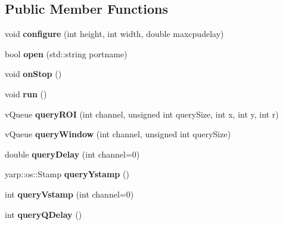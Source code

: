\subsection*{Public Member Functions}
\begin{DoxyCompactItemize}
\item 
void {\bfseries configure} (int height, int width, double maxcpudelay)\hypertarget{classev_1_1hSurfThread_a17acb3eb05f063ab81ab5128986ed7c8}{}\label{classev_1_1hSurfThread_a17acb3eb05f063ab81ab5128986ed7c8}

\item 
bool {\bfseries open} (std\+::string portname)\hypertarget{classev_1_1hSurfThread_afa2fc93ae2c64231e566738ebfddabf1}{}\label{classev_1_1hSurfThread_afa2fc93ae2c64231e566738ebfddabf1}

\item 
void {\bfseries on\+Stop} ()\hypertarget{classev_1_1hSurfThread_a7897b02f77738563c0d2fd5123dc4c51}{}\label{classev_1_1hSurfThread_a7897b02f77738563c0d2fd5123dc4c51}

\item 
void {\bfseries run} ()\hypertarget{classev_1_1hSurfThread_af4a0a8b35321419785dce1b94e43e5e3}{}\label{classev_1_1hSurfThread_af4a0a8b35321419785dce1b94e43e5e3}

\item 
v\+Queue {\bfseries query\+R\+OI} (int channel, unsigned int query\+Size, int x, int y, int r)\hypertarget{classev_1_1hSurfThread_ada4a11e319f5f0122897e21d6411bb1a}{}\label{classev_1_1hSurfThread_ada4a11e319f5f0122897e21d6411bb1a}

\item 
v\+Queue {\bfseries query\+Window} (int channel, unsigned int query\+Size)\hypertarget{classev_1_1hSurfThread_a89e485321978fdf785ba0e4e3b08a7ec}{}\label{classev_1_1hSurfThread_a89e485321978fdf785ba0e4e3b08a7ec}

\item 
double {\bfseries query\+Delay} (int channel=0)\hypertarget{classev_1_1hSurfThread_ae50c10e866f8692aae342d75e38369e7}{}\label{classev_1_1hSurfThread_ae50c10e866f8692aae342d75e38369e7}

\item 
yarp\+::os\+::\+Stamp {\bfseries query\+Ystamp} ()\hypertarget{classev_1_1hSurfThread_a02f2a70c6f8147e70e1689520555c389}{}\label{classev_1_1hSurfThread_a02f2a70c6f8147e70e1689520555c389}

\item 
int {\bfseries query\+Vstamp} (int channel=0)\hypertarget{classev_1_1hSurfThread_af5da61e8087f133f2202c873660779bc}{}\label{classev_1_1hSurfThread_af5da61e8087f133f2202c873660779bc}

\item 
int {\bfseries query\+Q\+Delay} ()\hypertarget{classev_1_1hSurfThread_a92089f336c6298e58440cee7f3b2eb07}{}\label{classev_1_1hSurfThread_a92089f336c6298e58440cee7f3b2eb07}

\end{DoxyCompactItemize}


